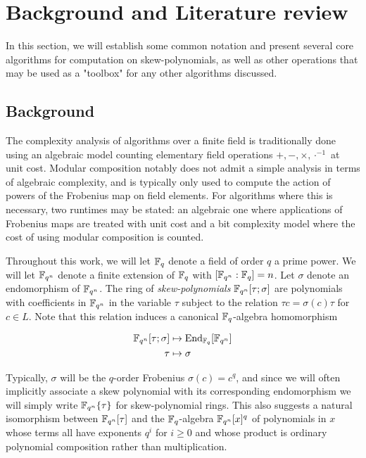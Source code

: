 

\chapter{Background and Literature review} \label{chap-3}

In this section, we will establish some common notation and present several core algorithms for computation on skew-polynomials, as well as other operations that may be used as a "toolbox" for any other algorithms discussed.

\section{Background}
The complexity analysis of algorithms over a finite field is traditionally done using an algebraic model counting elementary field operations $+, -, \times, \cdot^{-1}$ at unit cost. Modular composition notably does not admit a simple analysis in terms of algebraic complexity, and is typically only used to compute the action of powers of the Frobenius map on field elements. For algorithms where this is necessary, two runtimes may be stated: an algebraic one where applications of Frobenius maps are treated with unit cost and a bit complexity model where the cost of using modular composition is counted. 

Throughout this work, we will let $\mathbb{F}_{q}$ denote a field of order $q$ a prime power. We will let $\mathbb{F}_{q^n}$ denote a finite extension of $\mathbb{F}_q$ with $[\mathbb{F}_{q^n}:\mathbb{F}_q] = n$. Let $\sigma$ denote an endomorphism of $\mathbb{F}_{q^n}$. The ring of \textit{skew-polynomials} $\mathbb{F}_{q^n}[\tau;\sigma]$ are polynomials with coefficients in $\mathbb{F}_{q^n}$ in the variable $\tau$ subject to the relation $ \tau c = \sigma(c) \tau $ for $c \in L$.  Note that this relation induces a canonical $\mathbb{F}_q$-algebra homomorphism


    \begin{align*}
    \mathbb{F}_{q^n}[\tau; \sigma] & \mapsto \textnormal{End}_{\mathbb{F}_q}[\mathbb{F}_{q^n}] \\
    \tau & \mapsto \sigma
    \end{align*}

Typically, $\sigma$ will be the $q$-order Frobenius $\sigma(c) = c^q$, and since we will often implicitly associate a skew polynomial with its corresponding endomorphism we will simply write $\mathbb{F}_{q^n}\{\tau\}$ for skew-polynomial rings. This also suggests a natural isomorphism between $\mathbb{F}_{q^n}[\tau]$ and the $\mathbb{F}_q$-algebra $\mathbb{F}_{q^n}[x]^q$ of polynomials in $x$ whose terms all have exponents $q^i$ for $i \geq 0$ and whose product is ordinary polynomial composition rather than multiplication.

